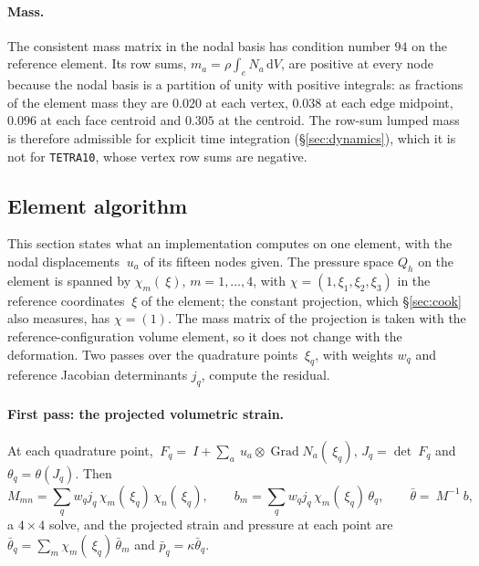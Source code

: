 \documentclass[11pt]{article}
\newcommand{\F}{~F}
\newcommand{\Id}{~I}
\newcommand{\Grad}{\operatorname{Grad}}
\newcommand{\diff}{\,\mathrm{d}}
\newcommand{\code}[1]{\texttt{#1}}
\theoremstyle{definition}
\theoremstyle{plain}
\begin{document}
\paragraph{Mass.} The consistent mass matrix in the nodal basis has
condition number $94$ on the reference element. Its row sums, $m_a = \rho
\int_e N_a \diff V$, are positive at every node because the nodal basis is
a partition of unity with positive integrals: as fractions of the element
mass they are $0.020$ at each vertex, $0.038$ at each edge midpoint, $0.096$
at each face centroid and $0.305$ at the centroid. The row-sum lumped mass
is therefore admissible for explicit time integration (\S\ref{sec:dynamics}),
which it is not for \code{TETRA10}, whose vertex row sums are negative.

\subsection{Element algorithm}
\label{sec:algorithm}

This section states what an implementation computes on one element, with
the nodal displacements $~u_a$ of its fifteen nodes given. The pressure
space $Q_h$ on the element is spanned by $\chi_m(~\xi)$, $m = 1, \dots, 4$,
with $\chi = (1, \xi_1, \xi_2, \xi_3)$ in the reference coordinates
$~\xi$ of the element; the constant projection, which \S\ref{sec:cook} also
measures, has $\chi = (1)$. The mass matrix of the projection is taken with
the reference-configuration volume element, so it does not change with the
deformation. Two passes over the quadrature points $~\xi_q$, with weights
$w_q$ and reference Jacobian determinants $j_q$, compute the residual.

\paragraph{First pass: the projected volumetric strain.} At each quadrature
point, $\F_q = \Id + \sum_a ~u_a \otimes \Grad N_a(~\xi_q)$, $J_q =
\det\F_q$ and $\theta_q = \theta(J_q)$. Then
\begin{equation}
  \label{eq:pass1}
  M_{mn} = \sum_q w_q j_q\, \chi_m(~\xi_q)\, \chi_n(~\xi_q),
  \qquad
  b_m = \sum_q w_q j_q\, \chi_m(~\xi_q)\, \theta_q,
  \qquad
  \bar\theta = ~M^{-1} ~b ,
\end{equation}
a $4 \times 4$ solve, and the projected strain and pressure at each point
are $\bar\theta_q = \sum_m \chi_m(~\xi_q)\,\bar\theta_m$ and $\bar p_q =
\kappa \bar\theta_q$.
\end{document}
